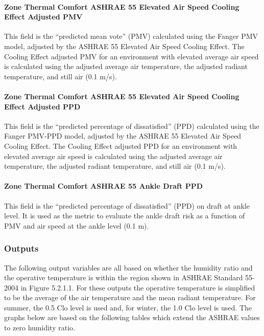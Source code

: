 \paragraph{Zone Thermal Comfort ASHRAE 55 Elevated Air Speed Cooling Effect Adjusted PMV}\label{zone-thermal-comfort-ashrae55-elevated-air-speed-cooling-effect-adjusted-pmv}

This field is the ``predicted mean vote'' (PMV) calculated using the Fanger PMV model, adjusted by the ASHRAE 55 Elevated Air Speed Cooling Effect. The Cooling Effect adjusted PMV for an environment with elevated average air speed is calculated using the adjusted average air temperature, the adjusted radiant temperature, and still air (0.1 m/s).

\paragraph{Zone Thermal Comfort ASHRAE 55 Elevated Air Speed Cooling Effect Adjusted PPD}\label{zone-thermal-comfort-ashrae55-elevated-air-speed-cooling-effect-adjusted-ppd}

This field is the ``predicted percentage of dissatisfied'' (PPD) calculated using the Fanger PMV-PPD model, adjusted by the ASHRAE 55 Elevated Air Speed Cooling Effect. The Cooling Effect adjusted PPD for an environment with elevated average air speed is calculated using the adjusted average air temperature, the adjusted radiant temperature, and still air (0.1 m/s).

\paragraph{Zone Thermal Comfort ASHRAE 55 Ankle Draft PPD}\label{zone-thermal-comfort-ashrae55-ankle-draft-ppd}

This field is the ``predicted percentage of dissatisfied'' (PPD) on draft at ankle level. It is used as the metric to evaluate the ankle draft risk as a function of PMV and air speed at the ankle level (0.1 m).

\subsubsection{Outputs}\label{outputs-1-014}

The following output variables are all based on whether the humidity ratio and the operative temperature is within the region shown in ASHRAE Standard 55-2004 in Figure 5.2.1.1. For these outputs the operative temperature is simplified to be the average of the air temperature and the mean radiant temperature. For summer, the 0.5 Clo level is used and, for winter, the 1.0 Clo level is used. The graphs below are based on the following tables which extend the ASHRAE values to zero humidity ratio.

